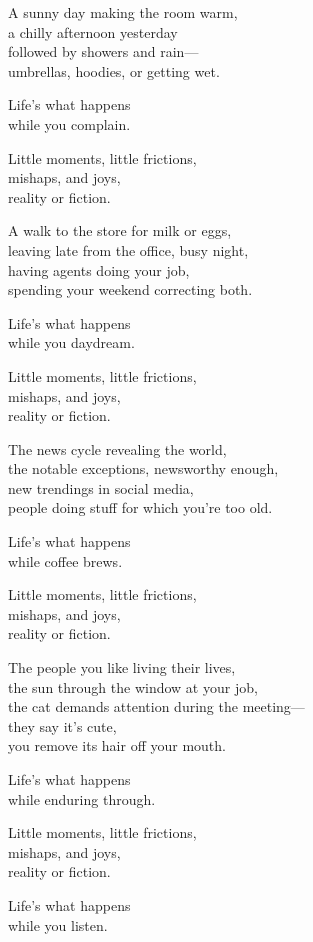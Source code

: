 \begin{lyrics}
A sunny day making the room warm,\\
a chilly afternoon yesterday\\
followed by showers and rain—\\
umbrellas, hoodies, or getting wet.

Life’s what happens\\
while you complain.

Little moments, little frictions,\\
mishaps, and joys,\\
reality or fiction.

A walk to the store for milk or eggs,\\
leaving late from the office, busy night,\\
having agents doing your job,\\
spending your weekend correcting both.

Life’s what happens\\
while you daydream.

Little moments, little frictions,\\
mishaps, and joys,\\
reality or fiction.

The news cycle revealing the world,\\
the notable exceptions, newsworthy enough,\\
new trendings in social media,\\
people doing stuff for which you’re too old.

Life’s what happens\\
while coffee brews.

Little moments, little frictions,\\
mishaps, and joys,\\
reality or fiction.

The people you like living their lives,\\
the sun through the window at your job,\\
the cat demands attention during the meeting—\\
they say it’s cute,\\
you remove its hair off your mouth.

Life’s what happens\\
while enduring through.

Little moments, little frictions,\\
mishaps, and joys,\\
reality or fiction.

Life's what happens\\
while you listen.
\end{lyrics}


